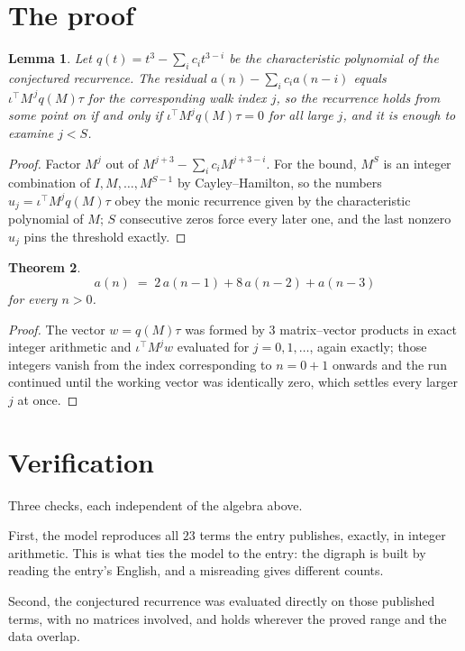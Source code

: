 \documentclass[11pt,a4paper]{article}
\theoremstyle{plain}
\newtheorem{theorem}{Theorem}
\newtheorem{lemma}[theorem]{Lemma}
\theoremstyle{definition}
\begin{document}
\section{The proof}

\begin{lemma}\label{lem:crit}
Let $q(t)=t^{3}-\sum_i c_it^{3-i}$ be the characteristic polynomial of the
conjectured recurrence. The residual $a(n)-\sum_ic_ia(n-i)$ equals
$\iota^{\!\top}M^{\,j}q(M)\tau$ for the corresponding walk index $j$, so the recurrence
holds from some point on if and only if $\iota^{\!\top}M^{j}q(M)\tau=0$ for all large $j$,
and it is enough to examine $j<S$.
\end{lemma}

\begin{proof}
Factor $M^{j}$ out of $M^{j+3}-\sum_ic_iM^{j+3-i}$. For the bound, $M^{S}$
is an integer combination of $I,M,\dots,M^{S-1}$ by Cayley--Hamilton, so the numbers
$u_j=\iota^{\!\top}M^{j}q(M)\tau$ obey the monic recurrence given by the characteristic
polynomial of $M$; $S$ consecutive zeros force every later one, and the last nonzero $u_j$
pins the threshold exactly.
\end{proof}

\begin{theorem}
\[
a(n)\;=\;2\,a(n-1) + 8\,a(n-2) + a(n-3)
\]
for every $n>0$.
\end{theorem}

\begin{proof}
The vector $w=q(M)\tau$ was formed by $3$ matrix--vector products in exact integer
arithmetic and $\iota^{\!\top}M^{j}w$ evaluated for $j=0,1,\dots$, again exactly; those
integers vanish from the index corresponding to $n=0+1$ onwards and the run continued
until the working vector was identically zero, which settles every larger $j$ at once.
\end{proof}

\section{Verification}

Three checks, each independent of the algebra above.

First, the model reproduces all $23$ terms the entry publishes, exactly, in integer
arithmetic. This is what ties the model to the entry: the digraph is built by reading the
entry's English, and a misreading gives different counts.

Second, the conjectured recurrence was evaluated directly on those published terms, with no
matrices involved, and holds wherever the proved range and the data overlap.
\end{document}
